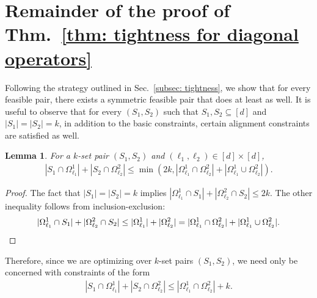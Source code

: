 \documentclass[12pt]{article}
\newtheorem{lem}[thm]{Lemma}
\theoremstyle{definition}
\numberwithin{equation}{section}
\numberwithin{equation}{section}
\newcommand{\Og}{\Omega}
\begin{document}


\appendix
\section{Remainder of the proof of Thm.~\ref{thm: tightness for diagonal operators}}
\label{sec: appendix}
Following the strategy outlined in Sec.~\ref{subsec: tightness}, we show that for every feasible pair, there exists a symmetric feasible pair that does at least as well. It is useful to observe that for every \((S_1,S_2)\) such that \(S_1, S_2 \subseteq [d]\) and \(|S_1|=|S_2|=k\), in addition to the basic constraints, certain alignment constraints are satisfied as well. 
\begin{lem}
\label{lem: some align are ok}
For a \(k\)-set pair \((S_1, S_2)\) and \((\ell_1, \ell_2) \in [d] \times [d]\), 
\begin{align}
|S_1 \cap \Og^1_{\ell_1}| + |S_2 \cap \Og^2_{\ell_2}| \leq \min (2 k, |\Og^{1}_{\ell_1} \cap \Og^{2}_{\ell_2}| + |\Og^{1}_{\ell_1} \cup  \Og^{2}_{\ell_2}|).
\end{align}
\end{lem}
\begin{proof}
The fact that \(|S_1|=|S_2|=k\) implies \(|\Og^{1}_{\ell_1} \cap S_1| + |\Og^{2}_{\ell_2} \cap S_2| \leq 2 k\). The other inequality follows from inclusion-exclusion:
\[ |\Og^{1}_{\ell_1} \cap S_1| + |\Og^{2}_{\ell_2} \cap S_2| \leq |\Og^{1}_{\ell_1}| + |\Og^{2}_{\ell_2}| = |\Og^{1}_{\ell_1} \cap \Og^{2}_{\ell_2}| + |\Og^{1}_{\ell_1} \cup  \Og^{2}_{\ell_2}|.\qedhere \] \end{proof}
Therefore, since we are optimizing over \(k\)-set pairs \((S_1, S_2)\), we need only be concerned with constraints of the form
\begin{align}
\label{eq: comb align cons reduced}
|S_1 \cap \Og^1_{\ell_1}| + |S_2 \cap \Og^2_{\ell_2}| \leq | \Og^{1}_{\ell_1} \cap \Og^{2}_{\ell_2} | + k.
\end{align}
\end{document}
